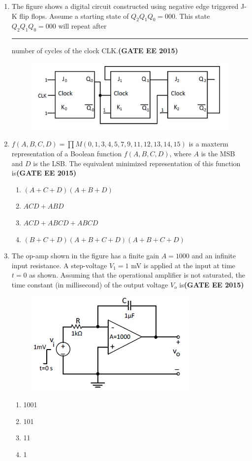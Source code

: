 \documentclass[a4paper,12pt]{exam}
\theoremstyle{remark}
\begin{document}
\begin{enumerate}
\item The figure shows a digital circuit constructed using negative edge triggered J-K flip flops. Assume a starting state of $Q_2Q_1Q_0=000$. This state $Q_2Q_1Q_0=000$ will repeat after \rule{3cm}{0.15mm} number of cycles of the clock CLK.\hfill{\textbf{(GATE EE 2015)}}
\begin{figure}[H]
    \centering
    \includegraphics[width=0.5\columnwidth]{figs/Q 47.png}
    \caption{}
    \label{fig:placeholder}
\end{figure}
\item $f(A,B,C,D) = \prod M(0,1,3,4,5,7,9,11,12,13,14,15)$ is a maxterm representation of a Boolean function $f(A,B,C,D)$, where $A$ is the MSB and $D$ is the LSB. The equivalent minimized representation of this function is\hfill{\textbf{(GATE EE 2015)}}
    \begin{enumerate}
        \item $(A + C + D)(A + B + D)$
        \item $ACD + ABD$
        \item $ACD + ABCD + ABCD$
        \item $(B + C + D)(A + B + C + D)(A + B + C + D)$
    \end{enumerate}

\item The op-amp shown in the figure has a finite gain $A = 1000$ and an infinite input resistance. A step-voltage $V_1 = 1$ mV is applied at the input at time $t = 0$ as shown. Assuming that the operational amplifier is not saturated, the time constant (in millisecond) of the output voltage $V_o$ is\hfill{\textbf{(GATE EE 2015)}}
\begin{figure}[H]
    \centering
    \includegraphics[width=0.5\columnwidth]{figs/Q 49.png}
    \caption{}
    \label{fig:placeholder}
\end{figure}
\begin{multicols}{4}
       \begin{enumerate}
        \item 1001
        \item 101
        \item 11
        \item 1
    \end{enumerate}
\end{multicols}


\end{enumerate}
\end{document}
